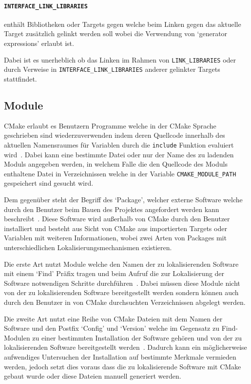 \documentclass[german,proseminar,hyperref,utf8,lof]{zihpub}
\begin{document}
    \paragraph{\texttt{INTERFACE\_LINK\_LIBRARIES}} enthält Bibliotheken oder Targets gegen welche beim Linken
    gegen das aktuelle Target zusätzlich gelinkt werden soll wobei die Verwendung von
    `generator expressions' erlaubt ist.

    Dabei ist es unerheblich ob das Linken im Rahmen von \texttt{LINK\_LIBRARIES} oder durch Verweise
    in \texttt{INTERFACE\_LINK\_LIBRARIES} anderer gelinkter Targets stattfindet.

    \subsection{Module}
    CMake erlaubt es Benutzern Programme welche in der CMake Sprache geschrieben sind wiederzuverwenden
    indem deren Quellcode innerhalb des aktuellen Namensraumes für Variablen durch die \texttt{include}
    Funktion evaluiert wird~.
    Dabei kann eine bestimmte Datei oder nur der Name des zu ladenden Moduls angegeben werden,
    in welchem Falle die den Quellcode des Moduls enthaltene Datei in Verzeichnissen welche in
    der Variable \texttt{CMAKE\_MODULE\_PATH} gespeichert sind gesucht wird.

    Dem gegenüber steht der Begriff des `Package', welcher externe Software welche durch den
    Benutzer beim Bauen des Projektes angefordert werden kann
    beschreibt~.
    Diese Software wird au{\ss}erhalb von CMake durch den Benutzer installiert und besteht aus
    Sicht von CMake aus importierten Targets oder Variablen mit weiteren Informationen, wobei
    zwei Arten von Packages mit unterschiedlichen Lokalisierungsmechanismen existieren.

    Die erste Art nutzt Module welche den Namen der zu lokalisierenden Software mit einem `Find'
    Präfix tragen und beim Aufruf die zur Lokalisierung der Software notwendigen Schritte
    durchführen~.
    Dabei müssen diese Module nicht von der zu lokalisierenden Software bereitgestellt werden sondern
    können auch durch den Benutzer in von CMake durchsuchten Verzeichnissen abgelegt werden.

    Die zweite Art nutzt eine Reihe von CMake Dateien mit dem Namen der Software und den Postfix `Config'
    und `Version' welche im Gegensatz zu Find-Modulen zu einer bestimmten Installation der Software
    gehören und von der zu lokalisierenden Software bereitgestellt
    werden~.
    Dadurch kann ein möglicherweise aufwendiges Untersuchen der Installation auf bestimmte Merkmale
    vermieden werden, jedoch setzt dies voraus dass die zu lokalisierende Software mit CMake
    gebaut wurde oder diese Dateien manuell generiert werden.
\end{document}
